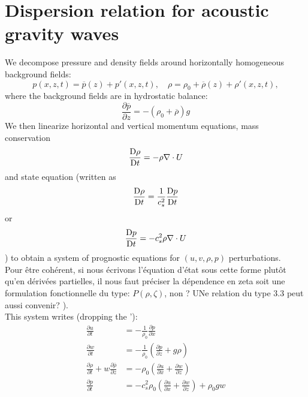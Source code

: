\documentclass[a4paper]{article}
\numberwithin{equation}{section}
\begin{document}
\newpage

\section{Dispersion relation for acoustic gravity waves}
We decompose pressure and density fields around horizontally homogeneous background fields:
\[
p(x,z,t)=\overline{p}(z)+p'(x,z,t),\quad \rho=\rho_0+\overline{\rho}(z)+\rho'(x,z,t),
\]
where the background fields are in hydrostatic balance:
\[
\frac{\partial \overline{p}}{\partial z}=-(\rho_0+\overline{\rho})g
\]
We then linearize horizontal and vertical momentum equations, mass conservation $$\frac{{\rm D}\rho}{{\rm D}t}=-\rho \nabla \cdot U$$ and state equation (written as $$\frac{{\rm D}\rho}{{\rm D}t}=\frac{1}{c_s^2}\frac{{\rm D}p}{{\rm D}t}$$ or $$\frac{{\rm D}p}{{\rm D}t}=-c_s^2\rho \nabla \cdot U$$) to obtain  a system of prognostic equations for $(u,v,\rho,p)$ perturbations. \\

\color{blue} Pour être cohérent, si nous écrivons l'équation d'état sous cette forme plutôt qu'en dérivées partielles, il nous faut préciser la dépendence en zeta soit une formulation fonctionnelle du type: $P(\rho,\zeta)$, non ? UNe relation du type 3.3 peut aussi convenir? ).\color{black}\\

This system writes (dropping the '):
\begin{align*}
\frac{\partial u}{\partial t}&=-\frac{1}{\rho_0}\frac{\partial p}{\partial x}\\
\frac{\partial w}{\partial t}&=-\frac{1}{\rho_0}\left(\frac{\partial p}{\partial z}+g\rho\right)\\
\frac{\partial \rho}{\partial t}+w\frac{\partial \overline{\rho}}{\partial z}&=-\rho_0\left(\frac{\partial u}{\partial x}+\frac{\partial w}{\partial z}\right)\\
\frac{\partial p}{\partial t}&=-c_s^2\rho_0\left(
\displaystyle \frac{\partial u}{\partial x}+\frac{\partial w}{\partial z}
\right)+\rho_0gw
\end{align*}
\end{document}
